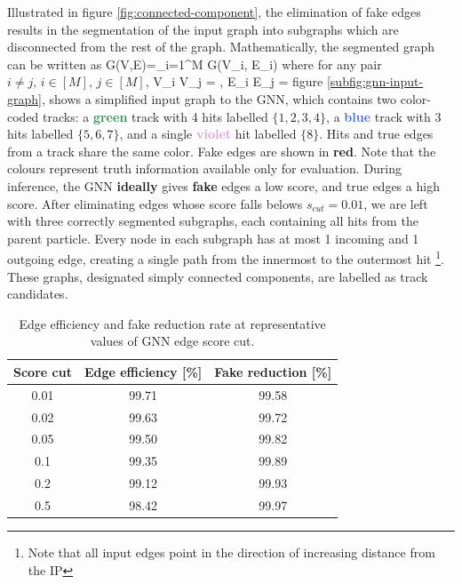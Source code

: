 Illustrated in figure \ref{fig:connected-component}, the elimination of fake edges results in the segmentation of the input graph into subgraphs which are disconnected from the rest of the graph. 
Mathematically, the segmented graph can be written as
\beq
\label{eq:11.2}
G(V,E)=\bigcup_{i=1}^{M} G(V_i, E_i)
\eeq
where for any pair $i\neq j,\,i\in [M], \, j\in[M]$, 
\beq
\label{eq:11.3}
V_i \cap V_j = \varnothing, \quad E_i \cap E_j = \varnothing 
\eeq
figure \ref{subfig:gnn-input-graph}, shows a simplified input graph to the GNN, which contains two color-coded tracks: 
a \textbf{\textcolor{SeaGreen}{green}} track with 4 hits labelled $\{1,2,3,4\}$, 
a \textbf{\textcolor{RoyalBlue}{blue}} track with 3 hits labelled $\{5,6,7\}$, 
and a single \textbf{\textcolor{Plum}{violet}} hit labelled $\{8\}$. 
Hits and true edges from a track share the same color. 
Fake edges are shown in \textbf{\textcolor{BrickRed}{red}}. 
Note that the colours represent truth information available only for evaluation. 
During inference, the GNN \textbf{ideally} gives \textbf{\textcolor{BrickRed}{fake}} edges a low score, and true edges a high score. 
After eliminating edges whose score falls belows $s_{cut} = 0.01$, we are left with three correctly segmented subgraphs, each containing all hits from the parent particle. 
Every node in each subgraph has at most 1 incoming and 1 outgoing edge, creating a single path from the innermost to the outermost hit \footnote{Note that all input edges point in the direction of increasing distance from the IP}. 
These graphs, designated simply connected components, are labelled as track candidates.

\begin{table}[h!]
    \centering
    \begin{tabular}{c|c|c}
       Score cut  & Edge efficiency [\%] & Fake reduction [\%] \\ \hline \hline
        0.01         & 99.71  &  99.58 \\
        0.02 & 99.63 & 99.72 \\
        0.05 & 99.50 & 99.82  \\
         0.1 & 99.35 & 99.89 \\
        0.2 & 99.12 & 99.93 \\
        0.5 & 98.42 & 99.97 \\ 
        \hline
    \end{tabular}
    \caption{Edge efficiency and fake reduction rate at representative values of GNN edge score cut. }
    \label{tab:score-cuts}
\end{table}

